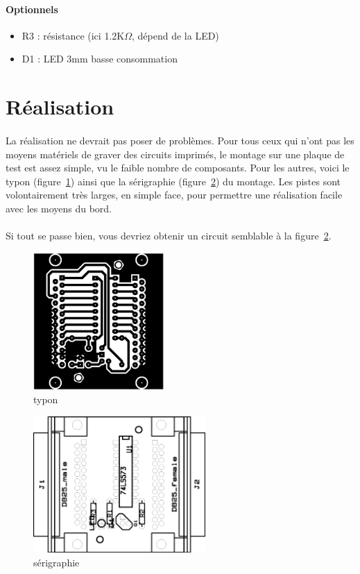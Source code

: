 \documentclass[11pt,a4paper]{book}
\begin{document}
\paragraph*{Optionnels}
\begin{itemize}
\item R3 : r\'esistance (ici 1.2K$\Omega$, d\'epend de la LED)
\item D1 : LED 3mm basse consommation
\end{itemize}
 
\section*{R\'ealisation}

\paragraph*{}
La r\'ealisation ne devrait pas poser de probl\`emes. Pour tous ceux qui n'ont pas les moyens
mat\'eriels de graver des circuits imprim\'es, le montage sur une plaque de test est assez
simple, vu le faible nombre de composants. Pour les autres, voici le typon (figure~\ref{latch2}) 
ainsi que la s\'erigraphie (figure~\ref{latch3}) du montage. Les pistes sont volontairement
tr\`es larges, en simple face, pour permettre une r\'ealisation facile avec les moyens du bord.

\paragraph*{}
Si tout se passe bien, vous devriez obtenir un circuit semblable \`a la figure~\ref{latch3}.

\begin{figure}
 \center
 \includegraphics[width=5cm]{./medias/latch2.png}
 \caption{typon}
 \label{latch2}
 \end{figure}
 
 \begin{figure}
 \center
 \includegraphics[height=52mm]{./medias/latch3.png}
 \caption{s\'erigraphie}
 \label{latch3}
 \end{figure}
 
\end{document}
